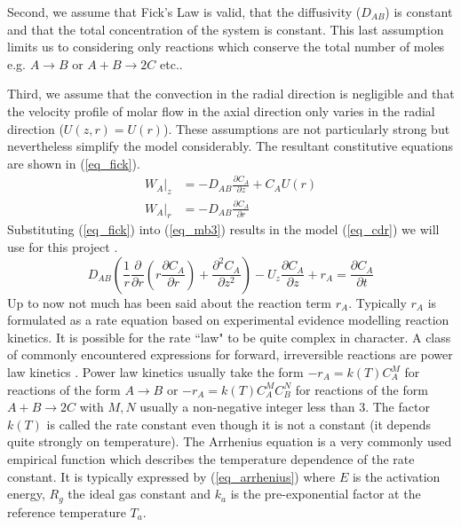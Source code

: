 \documentclass[11pt,fleqn]{article}
\theoremstyle{defstyle}
\begin{document}
Second, we assume that Fick's Law is valid, that the diffusivity ($D_{AB}$) is constant and that the total concentration of the system is constant. This last assumption limits us to considering only reactions which conserve the total number of moles e.g. $A \rightarrow B$ or $A + B \rightarrow 2C$ etc..

Third, we assume that the convection in the radial direction is negligible and that the velocity profile of molar flow in the axial direction only varies in the radial direction ($U(z,r)=U(r)$). These assumptions are not particularly strong but nevertheless simplify the model considerably. The resultant constitutive equations are shown in (\ref{eq_fick}).  
\begin{equation}
\begin{aligned}
W_A|_z &= -D_{AB}\frac{\partial C_A}{\partial z} + C_A U(r) \\
W_A|_r &= -D_{AB}\frac{\partial C_A}{\partial r}  
\end{aligned}
\label{eq_fick}
\end{equation} 
Substituting (\ref{eq_fick}) into (\ref{eq_mb3}) results in the model (\ref{eq_cdr}) we will use for this project \cite{fogler}.
\begin{equation}
D_{AB}\left(\frac{1}{r}\frac{\partial}{\partial r}\left(r\frac{\partial C_A}{\partial r}\right) + \frac{\partial^2 C_A}{\partial z^2}\right) - U_z\frac{\partial C_A}{\partial z} + r_A = \frac{\partial C_A}{\partial t}
\label{eq_cdr}
\end{equation}
Up to now not much has been said about the reaction term $r_A$. Typically $r_A$ is formulated as a rate equation based on experimental evidence modelling reaction kinetics. It is possible for the rate ``law" to be quite complex in character. A class of commonly encountered expressions for forward, irreversible reactions are power law kinetics \cite{levenspiel}. Power law kinetics usually take the form $-r_A=k(T)C_A^M$ for reactions of the form $A \rightarrow B$ or $-r_A=k(T)C_A^MC_B^N$ for reactions of the form $A + B \rightarrow 2C$ with $M,N$ usually a non-negative integer less than 3. The factor $k(T)$ is called the rate constant even though it is not a constant (it depends quite strongly on temperature). The Arrhenius equation is a very commonly used empirical function which describes the temperature dependence of the rate constant. It is typically expressed by (\ref{eq_arrhenius}) where $E$ is the activation energy, $R_g$ the ideal gas constant and $k_a$ is the pre-exponential factor at the reference temperature $T_a$. 
\end{document}
